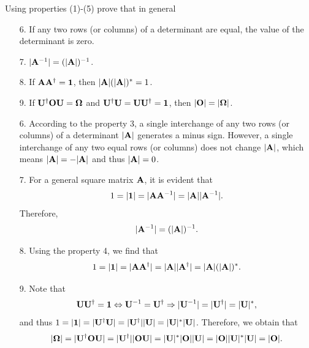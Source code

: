 \documentclass[a4paper]{book}
\newcounter{exercise}[chapter]
\newcounter{solution}[chapter]
\newcommand{\A}{{\bf A}}
\newcommand{\I}{{\bf 1}}
\newcommand{\U}{{\bf U}}
\newcommand{\Op}{{\bf O}}
\begin{document}
	\begin{exercise}
	Using properties (1)-(5) prove that in general
	\begin{itemize}
	
	\item[6.] If any two rows (or columns) of a determinant are equal, the value of the determinant is zero.
	
	\item[7.] $|\A^{-1}| = (|\A|)^{-1}$.
	
	\item[8.] If $\A\A^\dagger=\I$, then $|\A|(|\A|)^*=1$.
	
	\item[9.] If $\U^\dagger\Op\U = {\bf \Omega}$ and $\U^\dagger\U=\U\U^\dagger=\I$, then $|\Op|=|{\bf \Omega}|$.	
	
	\end{itemize}
	\end{exercise}
	
	\begin{solution}
	
	\begin{itemize}
	
	\item[6.] According to the property 3, a single interchange of any two rows (or columns) of a determinant $|\A|$ generates a minus sign. However, a single interchange of any two equal rows (or columns) does not change $|\A|$, which means $|\A| = -|\A|$ and thus $|\A| = 0$.
	
	\item[7.] For a general square matrix $\A$, it is evident that
	\[
		1 = |\I| = |\A \A^{-1}| = |\A| |\A^{-1}| .
	\] 
	Therefore,
	\[
		| \A^{-1} | = ( |\A| )^{-1} .
	\]
	
	\item[8.] Using the property 4, we find that
	\[
		1 = |\I| = | \A \A^\dagger | = | \A | | \A^\dagger | = | \A | (| \A |)^* .
	\]
	
	\item[9.] Note that	
	\[
		\U \U^\dagger = \I \Leftrightarrow \U^{-1} = \U^\dagger \Rightarrow | \U^{-1} | = | \U^\dagger | = | \U |^* ,
	\]	
	and thus $1 = | \I | = | \U^\dagger \U | = | \U^\dagger | | \U | = | \U |^* | \U |$. Therefore, we obtain that
	\[
		| {\bf \Omega} | = | \U^\dagger \Op \U | = | \U^\dagger | | \Op \U | = | \U |^* | \Op | | \U | = | \Op | | \U |^* | \U | = | \Op | .
	\]
	
	\end{itemize}		
	
	\end{solution}
	
\end{document}
